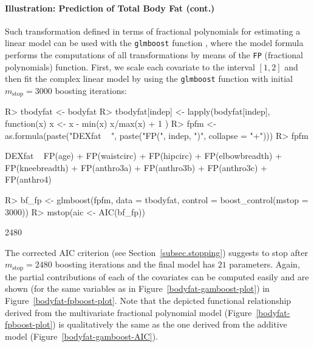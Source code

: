 \documentclass{article}
\newcommand{\Rpackage}[1]{{\normalfont\fontseries{b}\selectfont #1}}
\newcommand{\Rcmd}[1]{\texttt{#1}}
\newenvironment{Schunk}{}{}
\begin{document}
 

\paragraph{Illustration: Prediction of Total Body Fat (cont.)}


Such transformation defined in terms
of fractional polynomials for estimating a linear model can be used with
the \Rcmd{glmboost} function 
\citep[an implementation of the original fractional polynomials approach is
available in package \Rpackage{mfp}, see][]{pkg:mfp,Sauerbreietal2006},
where the model formula performs the computations of all transformations by 
means of the \Rcmd{FP} (fractional polynomials) function. First, we scale
each covariate to the interval $[1,2]$ and then fit the complex linear model
by using the \Rcmd{glmboost} function with initial $m_\text{stop} = 3000$ boosting
iterations:
\begin{Schunk}
\begin{Sinput}
R> tbodyfat <- bodyfat
R> tbodyfat[indep] <- lapply(bodyfat[indep], function(x) {
         x <- x - min(x)
         x/max(x) + 1
     })
R> fpfm <- as.formula(paste("DEXfat ~ ", paste("FP(", 
         indep, ")", collapse = "+")))
R> fpfm
\end{Sinput}
\begin{Soutput}
DEXfat ~ FP(age) + FP(waistcirc) + FP(hipcirc) + FP(elbowbreadth) + 
    FP(kneebreadth) + FP(anthro3a) + FP(anthro3b) + FP(anthro3c) + 
    FP(anthro4)
\end{Soutput}
\begin{Sinput}
R> bf_fp <- glmboost(fpfm, data = tbodyfat, control = boost_control(mstop = 3000))
R> mstop(aic <- AIC(bf_fp))
\end{Sinput}
\begin{Soutput}
[1] 2480
\end{Soutput}
\end{Schunk}
The corrected AIC criterion (see Section~\ref{subsec.stopping}) suggests to
stop after $m_\text{stop} = 2480$ 
boosting iterations and the final model has
$21$  
parameters. Again, the partial 
contributions of each of the covariates can be computed easily and are shown 
(for the same variables as in Figure~\ref{bodyfat-gamboost-plot}) in 
Figure~\ref{bodyfat-fpboost-plot}. Note that the depicted functional
relationship derived 
from the multivariate fractional polynomial model
(Figure~\ref{bodyfat-fpboost-plot}) is qualitatively the same as the one
derived from the additive model   
(Figure~\ref{bodyfat-gamboost-AIC}). 
\end{document}
